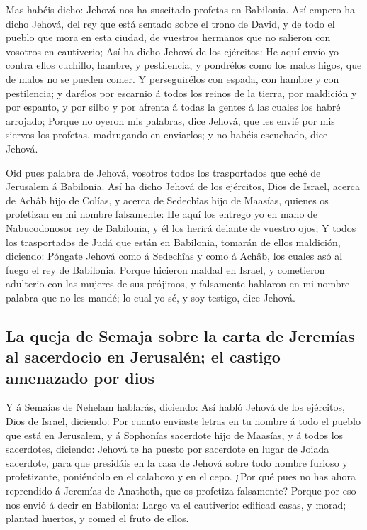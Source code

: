  Mas habéis dicho: Jehová nos ha suscitado profetas en
Babilonia.  Así empero ha dicho Jehová, del rey que está
sentado sobre el trono de David, y de todo el pueblo que mora en esta
ciudad, de vuestros hermanos que no salieron con vosotros en cautiverio;
 Así ha dicho Jehová de los ejércitos: He aquí envío yo
contra ellos cuchillo, hambre, y pestilencia, y pondrélos como los malos
higos, que de malos no se pueden comer.  Y perseguirélos
con espada, con hambre y con pestilencia; y darélos por escarnio á todos
los reinos de la tierra, por maldición y por espanto, y por silbo y por
afrenta á todas la gentes á las cuales los habré arrojado;
 Porque no oyeron mis palabras, dice Jehová, que les
envié por mis siervos los profetas, madrugando en enviarlos; y no habéis
escuchado, dice Jehová.

 Oid pues palabra de Jehová, vosotros todos los
trasportados que eché de Jerusalem á Babilonia.  Así ha
dicho Jehová de los ejércitos, Dios de Israel, acerca de Achâb hijo de
Colías, y acerca de Sedechîas hijo de Maasías, quienes os profetizan en
mi nombre falsamente: He aquí los entrego yo en mano de Nabucodonosor
rey de Babilonia, y él los herirá delante de vuestro ojos;
 Y todos los trasportados de Judá que están en Babilonia,
tomarán de ellos maldición, diciendo: Póngate Jehová como á Sedechîas y
como á Achâb, los cuales asó al fuego el rey de Babilonia.
 Porque hicieron maldad en Israel, y cometieron adulterio
con las mujeres de sus prójimos, y falsamente hablaron en mi nombre
palabra que no les mandé; lo cual yo sé, y soy testigo, dice Jehová.

\hypertarget{la-queja-de-semaja-sobre-la-carta-de-jeremuxedas-al-sacerdocio-en-jerusaluxe9n-el-castigo-amenazado-por-dios}{%
\subsection{La queja de Semaja sobre la carta de Jeremías al sacerdocio
en Jerusalén; el castigo amenazado por
dios}\label{la-queja-de-semaja-sobre-la-carta-de-jeremuxedas-al-sacerdocio-en-jerusaluxe9n-el-castigo-amenazado-por-dios}}

 Y á Semaías de Nehelam hablarás, diciendo:
 Así habló Jehová de los ejércitos, Dios de Israel,
diciendo: Por cuanto enviaste letras en tu nombre á todo el pueblo que
está en Jerusalem, y á Sophonías sacerdote hijo de Maasías, y á todos
los sacerdotes, diciendo:  Jehová te ha puesto por
sacerdote en lugar de Joiada sacerdote, para que presidáis en la casa de
Jehová sobre todo hombre furioso y profetizante, poniéndolo en el
calabozo y en el cepo.  ¿Por qué pues no has ahora
reprendido á Jeremías de Anathoth, que os profetiza falsamente?
 Porque por eso nos envió á decir en Babilonia: Largo va
el cautiverio: edificad casas, y morad; plantad huertos, y comed el
fruto de ellos.

